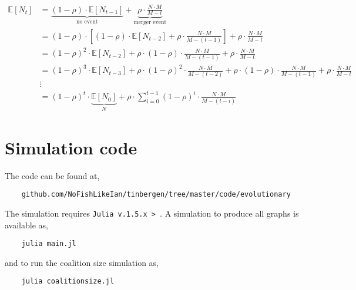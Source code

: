 \documentclass[american]{scrartcl}
\newcommand{\E}{\mathbb{E}}
\begin{document}
\begin{equation*}
    \begin{split}
        \E[N_t] &= \underbrace{(1 - \rho) \cdot \E[N_{t-1}]}_{\text{no event}} + \underbrace{\rho \cdot \frac{N \cdot M}{M-t}}_{\text{merger event}} \\
        &= (1 - \rho) \cdot \left[ (1 - \rho) \cdot \E[N_{t-2}] + \rho \cdot \frac{N \cdot M}{M - (t-1)} \right] + \rho \cdot \frac{N \cdot M}{M-t} \\
        &=(1 - \rho)^2 \cdot  \E[N_{t-2}] + \rho \cdot (1 - \rho) \cdot \frac{N \cdot M}{M - (t - 1)} + \rho \cdot \frac{N\cdot M}{M-t} \\
        &= (1 - \rho)^3 \cdot  \E[N_{t-3}] + \rho \cdot (1 - \rho)^2 \cdot \frac{N \cdot M}{M - (t - 2)} + \rho \cdot (1 - \rho) \cdot \frac{N \cdot M}{M - (t - 1)} + \rho \cdot \frac{N\cdot M}{M-t}  \\
        &\vdots \\
        &= (1 - \rho)^t \cdot \underbrace{\E[N_0]}_{N} + \rho \cdot \sum^{t-1}_{i = 0} (1 - \rho)^{i} \cdot \frac{N \cdot M}{M - (t - i)}
    \end{split}
\end{equation*}


\section{Simulation code} \label{A:code}

The code can be found at,

\begin{verbatim}
    github.com/NoFishLikeIan/tinbergen/tree/master/code/evolutionary
\end{verbatim}

The simulation requires \verb+Julia v.1.5.x > +. A simulation to produce all graphs is available as,

\begin{verbatim}
    julia main.jl
\end{verbatim}

and to run the coalition size simulation as,

\begin{verbatim}
    julia coalitionsize.jl
\end{verbatim}
\end{document}
